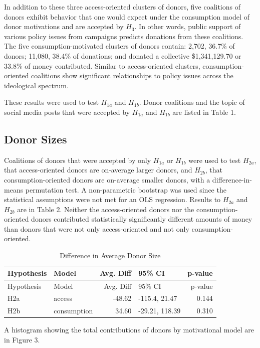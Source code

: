 \documentclass[12pt,]{article}
\begin{document}
In addition to these three access-oriented clusters of donors, five
coalitions of donors exhibit behavior that one would expect under the
consumption model of donor motivations and are accepted by \(H_{3}\). In
other words, public support of various policy issues from campaigns
predicts donations from these coalitions. The five consumption-motivated
clusters of donors contain: 2,702, 36.7\% of donors; 11,080, 38.4\% of
donations; and donated a collective \$1,341,129.70 or 33.8\% of money
contributed. Similar to access-oriented clusters, consumption-oriented
coalitions show significant relationships to policy issues across the
ideological spectrum.

These results were used to test \(H_{1a}\) and \(H_{1b}\). Donor
coalitions and the topic of social media posts that were accepted by
\(H_{1a}\) and \(H_{1b}\) are listed in Table 1.

\hypertarget{donor-sizes}{%
\subsection{Donor Sizes}\label{donor-sizes}}

Coalitions of donors that were accepted by only \(H_{1a}\) or \(H_{1b}\)
were used to test \(H_{2a}\), that access-oriented donors are on-average
larger donors, and \(H_{2b}\), that consumption-oriented donors are
on-average smaller donors, with a difference-in-means permutation test.
A non-parametric bootstrap was used since the statistical assumptions
were not met for an OLS regression. Results to \(H_{2a}\) and \(H_{2b}\)
are in Table 2. Neither the access-oriented donors nor the
consumption-oriented donors contributed statistically significantly
different amounts of money than donors that were not only
access-oriented and not only consumption-oriented.

\begin{longtable}[]{@{}llrlr@{}}
\caption{Difference in Average Donor Size}\tabularnewline
\toprule
Hypothesis & Model & Avg. Diff & 95\% CI & p-value\tabularnewline
\midrule
\endfirsthead
\toprule
Hypothesis & Model & Avg. Diff & 95\% CI & p-value\tabularnewline
\midrule
\endhead
H2a & access & -48.62 & -115.4, 21.47 & 0.144\tabularnewline
H2b & consumption & 34.60 & -29.21, 118.39 & 0.310\tabularnewline
\bottomrule
\end{longtable}

A histogram showing the total contributions of donors by motivational
model are in Figure 3.
\end{document}
